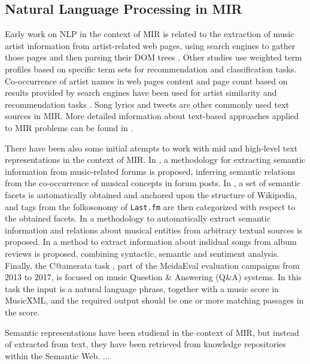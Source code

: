 \subsection{Natural Language Processing in MIR}

Early work on NLP in the context of MIR is related to the extraction of music artist information from artist-related web pages, using search engines to gather those pages and then parsing their DOM trees \citep{Cohen2000}. Other studies \citep{Ellis2002,Whitman2002} use weighted term profiles based on specific term sets for recommendation and classification tasks. 
Co-occurrence of artist names in web pages content and page count based on results provided by search engines have been used for artist similarity and recommendation tasks \citep{Schedl2005}. Song lyrics \citep{TODO} and tweets \citep{Schedl2013a} are other commonly used text sources in MIR. %
More detailed information about text-based approaches applied to MIR problems can be found in \cite{Knees2013, Schedl2014}.

There have been also some initial atempts to work with mid and high-level text representations in the context of MIR. In \cite{Sordo2012}, a methodology for extracting semantic information from music-related forums is proposed, inferring semantic relations from the co-occurrence of musical concepts in forum posts. 
In \cite{Sordo2013}, a set of semantic facets is automatically obtained and anchored upon the structure of Wikipedia, and tags from the folkosonomy of \texttt{Last.fm} are then categorized with respect to the obtained facets. 
In \cite{Knees2011} a methodology to automatically extract semantic information and relations about musical entities from arbitrary textual sources is proposed. In \cite{TataandDiEugenio2010} a method to extract information about indidual songs from album reviews is proposed, combining syntactic, semantic and sentiment analysis. Finally, the C@amerata task \cite{sutcliffe2016c, sutcliffe2015}, part of the MeidaEval evaluation campaigns from 2013 to 2017, is focused on music Question \& Answering (Q\&A) systems. In this task the input is a natural language phrase, together with a music score in MusicXML, and the required output should be one or more matching passages in the score.

Semantic representations have been studiend in the context of MIR, but instead of extracted from text, they have been retrieved from knowledge repositories within the Semantic Web. ...

